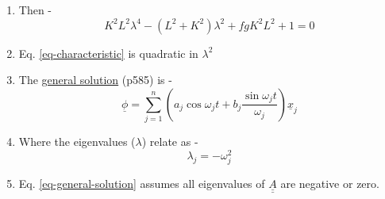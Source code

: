 \documentclass[11pt,a4paper]{article}
\begin{document}
\begin{enumerate}[leftmargin=*,topsep=0pt]
    \item Then - 
        \begin{equation} \label{eq-characteristic}
            K^2L^2\lambda^4-(L^2+K^2)\lambda^2+fgK^2L^2+1=0
        \end{equation}
    \item[] Eq. \ref{eq-characteristic} is quadratic in $\lambda^2$
    \item The \href{http://www.math.utah.edu/~gustafso/2250systems-de.pdf}{general solution} (p585) is - 
        \begin{equation} \label{eq-general-solution}
            \underline{\phi}=\sum_{j=1}^{n}(a_j \cos\omega_j t+b_j\frac{\sin\omega_j t}{\omega_j})\underline{x}_j
        \end{equation}
    \item[] Where the eigenvalues ($\lambda$) relate as -
        \begin{equation*}
            \lambda_j = -\omega_j^2
        \end{equation*}
    \item[] Eq. \ref{eq-general-solution} assumes all eigenvalues of $\underline{\underline{A}}$ are negative or zero.
\end{enumerate}
\end{document}
